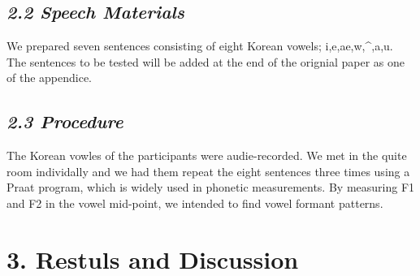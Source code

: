 \documentclass[man, fleqn, noextraspace]{apa6}
\begin{document}
\subsection{\texorpdfstring{\emph{2.2 Speech
Materials}}{2.2 Speech Materials}}\label{speech-materials}

We prepared seven sentences consisting of eight Korean vowels;
i,e,ae,w,\^{},a,u. The sentences to be tested will be added at the end
of the orignial paper as one of the appendice.

\subsection{\texorpdfstring{\emph{2.3
Procedure}}{2.3 Procedure}}\label{procedure}

The Korean vowles of the participants were audie-recorded. We met in the
quite room individally and we had them repeat the eight sentences three
times using a Praat program, which is widely used in phonetic
measurements. By measuring F1 and F2 in the vowel mid-point, we intended
to find vowel formant patterns.

\section{\texorpdfstring{\textbf{3. Restuls and
Discussion}}{3. Restuls and Discussion}}\label{restuls-and-discussion}
\end{document}
